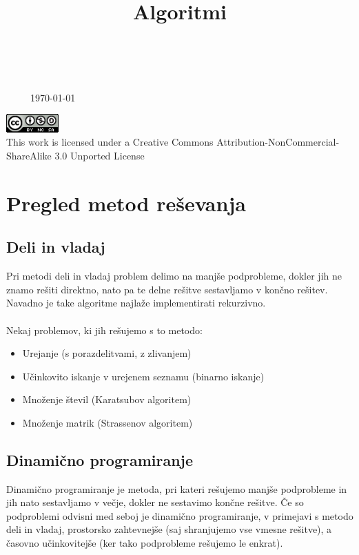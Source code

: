 \documentclass[10pt,a4paper,oneside]{book}
\title{Algoritmi}
\newenvironment{items}{
\begin{itemize}
  \setlength{\itemsep}{1pt}
  \setlength{\parskip}{0pt}
  \setlength{\parsep}{0pt}
}{\end{itemize}}
\begin{document}
\begin{titlepage}
\begin{center}
\ \\[5cm]
{}\\[-16pt]
{\ \ \ \ \ \huge \today}


\vfill
\parbox{7.5cm}{
\begin{center}
\includegraphics[width=0.15\textwidth]{./CC}\\[6pt]

This work is licensed under a Creative Commons Attribution-NonCommercial-ShareAlike 3.0 Unported License
\end{center}
}

\end{center}
\end{titlepage}
\tableofcontents
\pagebreak
\chapter{Pregled metod reševanja}
\section{Deli in vladaj}
Pri metodi deli in vladaj problem delimo na manjše podprobleme, dokler jih ne znamo rešiti direktno, nato pa te delne rešitve sestavljamo v končno rešitev. Navadno je take algoritme najlaže implementirati rekurzivno.\\
 \\
Nekaj problemov, ki jih rešujemo s to metodo:
\begin{items}
	\item Urejanje (s porazdelitvami, z zlivanjem)
	\item Učinkovito iskanje v urejenem seznamu (binarno iskanje)
	\item Množenje števil (Karatsubov algoritem)
	\item Množenje matrik (Strassenov algoritem)
\end{items}

\section{Dinamično programiranje}
Dinamično programiranje je metoda, pri kateri rešujemo manjše podprobleme in jih nato sestavljamo v večje, dokler ne sestavimo končne rešitve. Če so podproblemi odvisni med seboj je dinamično programiranje, v primejavi s metodo deli in vladaj, prostorsko zahtevnejše (saj shranjujemo vse vmesne rešitve), a časovno učinkovitejše (ker tako podprobleme rešujemo le enkrat).
\end{document}
